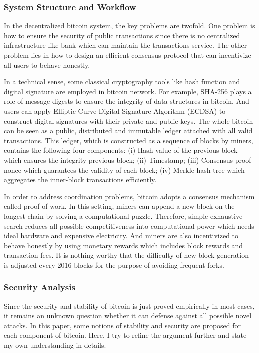 \documentclass[conference]{IEEEtran}
\begin{document}
\subsubsection{System Structure and Workflow}
In the decentralized bitcoin system, the key problems are twofold. 
%
One problem is how to ensure the security of public transactions since there is no centralized infrastructure like bank which can maintain the transactions service.
%
The other problem lies in how to design an efficient consensus protocol that can incentivize all users to behave honestly.

In a technical sense, some classical cryptography tools like hash function and digital signature are employed in bitcoin network.
%
For example, SHA-256 plays a role of message digests to ensure the integrity of data structures in bitcoin.
%
And users can apply Elliptic Curve Digital Signature Algorithm (ECDSA)\cite{johnson2001elliptic} to construct digital signatures with their private and public keys.
%
The whole bitcoin can be seen as a public, distributed and immutable ledger attached with all valid transactions.
%
This ledger, which is constructed as a sequence of blocks by miners, contains the following four components:
(i) Hash value of the previous block which ensures the integrity previous block; 
(ii) Timestamp; 
(iii) Consensus-proof nonce which guarantees the validity of each block;  
(iv) Merkle hash tree which aggregates the inner-block transactions efficiently.

In order to address coordination problems, bitcoin adopts a consensus mechanism called proof-of-work.
%
In this setting, miners can append a new block on the longest chain by solving a computational puzzle.
%
Therefore, simple exhaustive search reduces all possible competitiveness into computational power which needs ideal hardware and expensive electricity.
%
And miners are also incentivized to behave honestly by using monetary rewards which includes block rewards and transaction fees.
%
It is nothing worthy that the difficulty of new block generation is adjusted every 2016 blocks for the purpose of avoiding frequent forks.

\subsubsection{Security Analysis}
Since the security and stability of bitcoin is just proved empirically in most cases, it remains an unknown question whether it can defense against all possible novel attacks.
%
In this paper, some notions of stability and security are proposed for each component of bitcoin. Here, I try to refine the argument further and state my own understanding in details.
\end{document}
